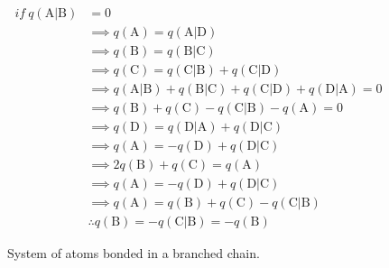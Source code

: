 \begin{align}
    if\: q(\mathrm{A}|\mathrm{B}) &= 0 \nonumber\\
      & \implies q(\mathrm{A}) = q(\mathrm{A}|\mathrm{D}) \nonumber \\
      & \implies q(\mathrm{B}) = q(\mathrm{B}|\mathrm{C}) \nonumber \\
      & \implies q(\mathrm{C}) = q(\mathrm{C}|\mathrm{B}) + q(\mathrm{C}|\mathrm{D}) \nonumber \\
      & \implies q(\mathrm{A}|\mathrm{B}) + q(\mathrm{B}|\mathrm{C}) + q(\mathrm{C}|\mathrm{D}) + q(\mathrm{D}|\mathrm{A}) = 0 \nonumber \\
      & \implies q(\mathrm{B}) + q(\mathrm{C}) - q(\mathrm{C}|\mathrm{B}) - q(\mathrm{A}) = 0 \nonumber \\
      & \implies q(\mathrm{D}) = q(\mathrm{D}|\mathrm{A}) + q(\mathrm{D}|\mathrm{C}) \nonumber \\
      & \implies q(\mathrm{A}) = -q(\mathrm{D}) + q(\mathrm{D}|\mathrm{C}) \nonumber \\
      & \implies 2q(\mathrm{B}) + q(\mathrm{C}) = q(\mathrm{A}) \nonumber \\
      & \implies q(\mathrm{A}) = -q(\mathrm{D}) + q(\mathrm{D}|\mathrm{C}) \nonumber \\
      & \implies q(\mathrm{A}) = q(\mathrm{B}) + q(\mathrm{C}) - q(\mathrm{C}|\mathrm{B}) \nonumber \\
      &\therefore q(\mathrm{B}) = -q(\mathrm{C}|\mathrm{B}) = -q(\mathrm{B})
\end{align}

\newpage

\begin{figure}[ht]
  \centering
  \scalebox{.4}{}
  \caption{System of atoms bonded in a branched chain.}
  \label{third_case}
\end{figure}

